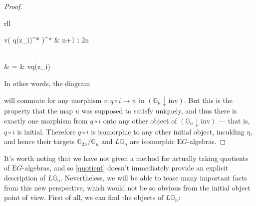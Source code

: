 \begin{proof}
\begin{eq*}
\begin{array}{rll}
\begin{cases}
      				v\big( q(z_i)^* \big)^* & \quad {} \quad n+1 \leq i \leq 2n \\
			\end{cases} \\
		& = & vq(z_i)
		\end{array}
\end{eq*}
In other words, the diagram
\begin{eq*}  \end{eq*}
will commute for any morphism $v: q \circ i \to \psi$ in $(\mathbb{G}_n \downarrow \mathrm{inv})$. But this is the property that the map $u$ was supposed to satisfy uniquely, and thus there is exactly one morphism from $q \circ i$ onto any other object of $(\mathbb{G}_n \downarrow \mathrm{inv})$ --- that is, $q \circ i$ is initial. Therefore $q \circ i$ is isomorphic to any other initial object, inculding $\eta$, and hence their targets $\mathbb{G}_{2n}/\mathbb{G}_n$ and $L\mathbb{G}_n$ are isomorphic $\mathrm{E}G$-algebras.
\end{proof}

It's worth noting that we have not given a method for actually taking quotients of $\mathrm{E}G$-algebras, and so \cref{quotient} doesn't immediately provide an explicit description of $L\mathbb{G}_n$. Nevertheless, we will be able to tease many important facts from this new perspective, which would not be so obvious from the initial object point of view. First of all, we can find the objects of $L\mathbb{G}_n$:

